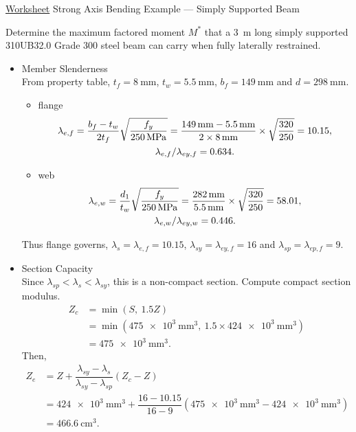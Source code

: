 \begin{exmp}\href{run:./WORKSHEET/CH05/EX5.BSSB.sm}{Worksheet}
Strong Axis Bending Example --- Simply Supported Beam

Determine the maximum factored moment $M^*$ that a \SI{3}{\meter} long simply supported 310UB32.0 Grade 300 steel beam can carry when fully laterally restrained.
\begin{figure}[H]

\end{figure}
\end{exmp}
\begin{solution}
\begin{itemize}
\item Member Slenderness\\
From property table, $t_f=\SI{8}{\mm}$, $t_w=\SI{5.5}{\mm}$, $b_f=\SI{149}{\mm}$ and $d=\SI{298}{\mm}$.
\begin{itemize}
\item flange
\begin{gather*}
\lambda_{e,f}=\dfrac{b_f-t_w}{2t_f}\sqrt{\dfrac{f_y}{\SI{250}{\mega\pascal}}}=\dfrac{\SI{149}{\milli\meter}-\SI{5.5}{\milli\meter}}{2\times\SI{8}{\milli\meter}}\times\sqrt{\dfrac{320}{250}}=10.15,\\\lambda_{e,f}/\lambda_{ey,f}=0.634.
\end{gather*}
\item web
\begin{gather*}
\lambda_{e,w}=\dfrac{d_1}{t_w}\sqrt{\dfrac{f_y}{\SI{250}{\mega\pascal}}}=\dfrac{\SI{282}{\milli\meter}}{\SI{5.5}{\milli\meter}}\times\sqrt{\dfrac{320}{250}}=58.01,\\\lambda_{e,w}/\lambda_{ey,w}=0.446.
\end{gather*}
\end{itemize}
Thus flange governs, $\lambda_s=\lambda_{e,f}=10.15$, $\lambda_{sy}=\lambda_{ey,f}=16$ and $\lambda_{sp}=\lambda_{ep,f}=9$.
\item Section Capacity\\
Since $\lambda_{sp}<\lambda_s<\lambda_{sy}$, this is a non-compact section. Compute compact section modulus.
\begin{align*}
Z_c&=\min\left(S,~1.5Z\right)\\&=\min\left(\SI{475e3}{\mm^3},~1.5\times\SI{424e3}{\mm^3}\right)\\&=\SI{475e3}{\mm^3}.
\end{align*}
Then,
\begin{align*}
Z_e&=Z+\dfrac{\lambda_{sy}-\lambda_s}{\lambda_{sy}-\lambda_{sp}}\left(Z_c-Z\right)\\&=\SI{424e3}{\mm^3}+\dfrac{16-10.15}{16-9}\left(\SI{475e3}{\mm^3}-\SI{424e3}{\mm^3}\right)\\&=\SI{466.6}{\cm^3}.

\end{align*}
\end{itemize}
\end{solution}
